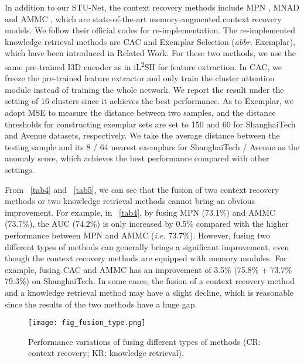 \documentclass[lettersize,journal]{IEEEtran}
\begin{document}
In addition to our STU-Net, the context recovery methods include MPN \cite{LearningNormal2021lva}, MNAD \cite{LearningMemoryGuided2020parka} and AMMC \cite{AppearanceMotionMemory2021caia}, which are state-of-the-art memory-augmented context recovery models.
We follow their official codes for re-implementation.
The re-implemented knowledge retrieval methods are CAC \cite{ClusterAttention2020wanga} and Exemplar Selection \cite{StreetScene2020ramachandraa} (\textit{abbr.} Exemplar), which have been introduced in Related Work.
For these two methods, we use the same pre-trained I3D encoder as in iL\textsuperscript{2}SH for feature extraction.
In CAC, we freeze the pre-trained feature extractor and only train the cluster attention module instead of training the whole network.
We report the result under the setting of 16 clusters since it achieves the best performance.
As to Exemplar, we adopt MSE to measure the distance between two samples, and the distance thresholds for constructing exemplar sets are set to 150 and 60 for ShanghaiTech and Avenue datasets, respectively.
We take the average distance between the testing sample and its 8 / 64 nearest exemplars for ShanghaiTech / Avenue as the anomaly score, which achieves the best performance compared with other settings.

From \tablename~\ref{tab4} and \tablename~\ref{tab5}, we can see that the fusion of two context recovery methods or two knowledge retrieval methods cannot bring an obvious improvement.
For example, in \tablename~\ref{tab4}, by fusing MPN (73.1\%) and AMMC (73.7\%), the AUC (74.2\%) is only increased by 0.5\% compared with the higher performance between MPN and AMMC (\textit{i.e.} 73.7\%).
However, fusing two different types of methods can generally brings a significant improvement, even though the context recovery methods are equipped with memory modules.
For example, fusing CAC and AMMC has an improvement of 3.5\% (75.8\% + 73.7\%  79.3\%) on ShanghaiTech.
In some cases, the fusion of a context recovery method and a knowledge retrieval method may have a slight decline, which is reasonable since the results of the two methods have a huge gap.


\begin{figure}[!t]
	\centering
	\texttt{[image: fig\_fusion\_type.png]}
	\caption{Performance variations of fusing different types of methods (CR: context recovery; KR: knowledge retrieval).}
	\label{fig_fusion_type}
\end{figure}
\end{document}
